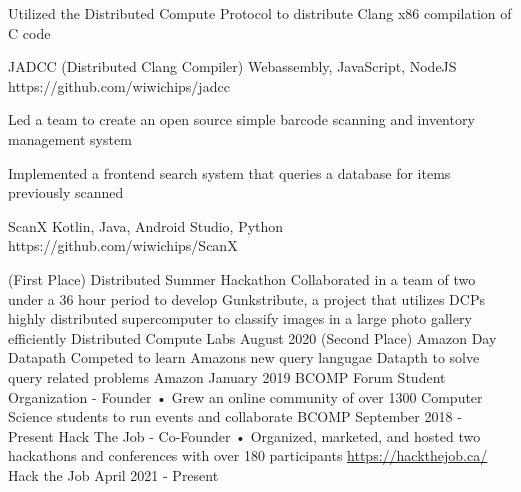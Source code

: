 \documentclass[]{awesome-cv}
\begin{document}
\vspace{-7mm}
\begin{cventries}
	\cventry
  {\begin{cvitems}
  	\item{Utilized the Distributed Compute Protocol to distribute Clang x86 compilation of C code}
  \end{cvitems}}
	{JADCC (Distributed Clang Compiler)}
	{Webassembly, JavaScript, NodeJS}
	{https://github.com/wiwichips/jadcc}
	{}
	
	\vspace{-5mm}
	\cventry
  {\begin{cvitems}
    \item{Led a team to create an open source simple barcode scanning and inventory management system}
    \item{Implemented a frontend search system that queries a database for items previously scanned}
  \end{cvitems}}
	{ScanX}
	{Kotlin, Java, Android Studio, Python}
	{https://github.com/wiwichips/ScanX}
	{}

	\vspace{-5mm}
\end{cventries}
\begin{cvhonors}
	\cvhonor
	{(First Place) Distributed Summer Hackathon}
	{Collaborated in a team of two under a 36 hour period to develop Gunkstribute, a project that utilizes DCP\textquotesingle{}s highly distributed supercomputer to classify images in a large photo gallery efficiently}
	{Distributed Compute Labs}
	{August 2020}
	\cvhonor
	{(Second Place) Amazon Day Datapath}
	{Competed to learn Amazon\textquotesingle{}s new query langugae Datapth to solve query related problems}
	{Amazon}
	{January 2019}
	\cvhonor
	{BCOMP Forum Student Organization - Founder}
	{• Grew an online community of over 1300 Computer Science students to run events and collaborate}
	{BCOMP}
	{September 2018 - Present}
  \cvhonor
  {Hack The Job - Co-Founder}
  {• Organized, marketed, and hosted two hackathons and conferences with over 180 participants \href{https://hackthejob.ca/}{https://hackthejob.ca/}}
  {Hack the Job}
  {April 2021 - Present}
\end{cvhonors}
\ 
\end{document}
